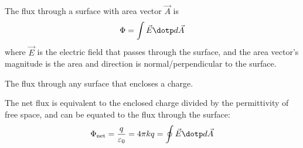 \begin{definition}
  The flux through a surface with area vector $\vec{A}$ is
  \[
    \Phi = \int \vec{E} \dotp d\vec{A}
  \]
  where $\vec{E}$ is the electric field that passes through the surface, and the area vector's magnitude is the area and direction is normal/perpendicular to the surface.
\end{definition}

\begin{definition}
  The flux through any surface that encloses a charge.
\end{definition}

\begin{namedtheorem}
  The net flux is equivalent to the enclosed charge divided by the permittivity of free space, and can be equated to the flux through the surface:
  \[
    \Phi_{\text{net}} = \frac{q}{\varepsilon_0} = 4\pi k q = \oint \vec{E} \dotp d\vec{A}
  \]
\end{namedtheorem}

